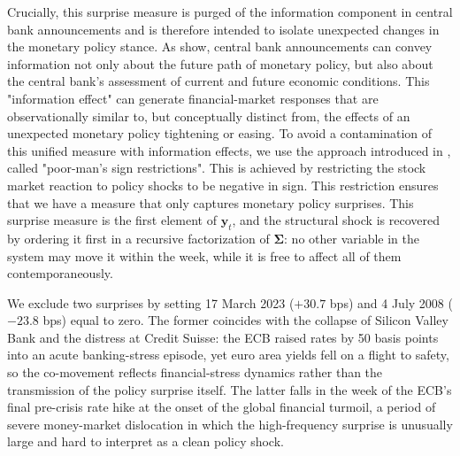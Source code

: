Crucially, this surprise measure is purged of the information component in central bank announcements and is therefore intended to isolate unexpected changes in the monetary policy stance. As \citet{jarocinski2020deconstructing} show, central bank announcements can convey information not only about the future path of monetary policy, but also about the central bank's assessment of current and future economic conditions. This "information effect" can generate financial-market responses that are observationally similar to, but conceptually distinct from, the effects of an unexpected monetary policy tightening or easing. To avoid a contamination of this unified measure with information effects, we use the approach introduced in \cite{jarocinski2020deconstructing}, called "poor-man's sign restrictions". This is achieved by restricting the stock market reaction to policy shocks to be negative in sign. This restriction ensures that we have a measure that only captures monetary policy surprises. This surprise measure is the first element of $\bm y_t$, and the structural shock is recovered by ordering it first in a recursive factorization of $\bm \Sigma$: no other variable in the system may move it within the week, while it is free to affect all of them contemporaneously. %

We exclude two surprises by setting 17 March 2023 ($+30.7$ bps) and 4 July 2008 ($-23.8$ bps) equal to zero. The former coincides with the collapse of Silicon Valley Bank and the distress at Credit Suisse: the ECB raised rates by 50 basis points into an acute banking-stress episode, yet euro area yields fell on a flight to safety, so the co-movement reflects financial-stress dynamics rather than the transmission of the policy surprise itself. The latter falls in the week of the ECB's final pre-crisis rate hike at the onset of the global financial turmoil, a period of severe money-market dislocation in which the high-frequency surprise is unusually large and hard to interpret as a clean policy shock.


